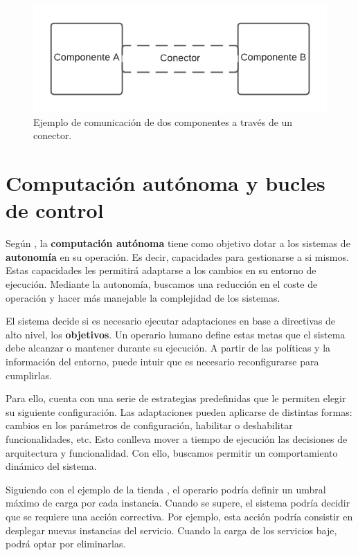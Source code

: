\begin{figure}[h!]
  \centering
  \includegraphics[scale=0.78]{cap_contexto_tecnologico/images/conector}
  \caption{Ejemplo de comunicación de dos componentes a través de un conector.}
  \label{fig:componentesYConectorEjemplo}
\end{figure}

\section{Computación autónoma y bucles de control}

Según \cite{ibmcorporationArchitecturalBlueprintAutonomic2006}, la \textbf{computación autónoma} tiene como objetivo dotar a los sistemas de \textbf{autonomía} en su operación. Es decir, capacidades para gestionarse a si mismos. Estas capacidades les permitirá adaptarse a los cambios en su entorno de ejecución. Mediante la autonomía, buscamos una reducción en el coste de operación y hacer más manejable la complejidad de los sistemas.

El sistema decide si es necesario ejecutar adaptaciones en base a directivas de alto nivel, los \textbf{objetivos}. Un operario humano define estas metas que el sistema debe alcanzar o mantener durante su ejecución. A partir de las políticas y la información del entorno, puede intuir que es necesario reconfigurarse para cumplirlas.

Para ello, cuenta con una serie de estrategias predefinidas que le permiten elegir su siguiente configuración. \cite{garlanIncreasingSystemDependability2003} Las adaptaciones pueden aplicarse de distintas formas: cambios en los parámetros de configuración, habilitar o deshabilitar funcionalidades, etc. Esto conlleva mover a tiempo de ejecución las decisiones de arquitectura y funcionalidad. Con ello, buscamos permitir un comportamiento dinámico del sistema. \cite{brunEngineeringSelfAdaptiveSystems2009}

Siguiendo con el ejemplo de la tienda , el operario podría definir un umbral máximo de carga por cada instancia. Cuando se supere, el sistema podría decidir que se requiere una acción correctiva. Por ejemplo, esta acción podría consistir en desplegar nuevas instancias del servicio. Cuando la carga de los servicios baje, podrá optar por eliminarlas.

